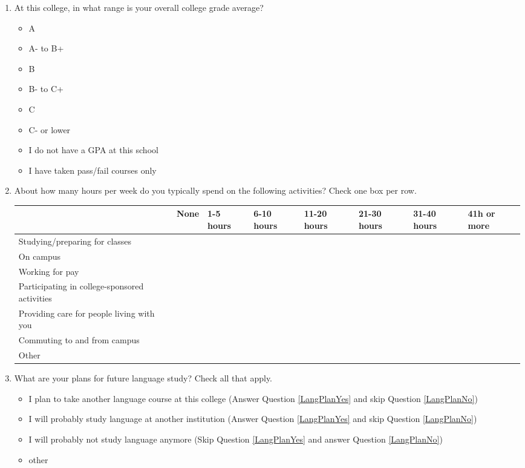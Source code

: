 \documentclass[letterpaper,10pt]{article}
\begin{document}
\begin{enumerate}[resume]
\item At this college, in what range is your overall college grade average?
\vspace{-0.1in}\begin{multicols}{2}
\begin{itemize}
	\item A
	\item A- to B+
	\item B
	\item B- to C+
	\item C
	\item C- or lower
	\item I do not have a GPA at this school 
	\item I have taken pass/fail courses only
\end{itemize}
\end{multicols}

\item About how many hours per week do you typically spend on the following activities? Check one box per row.	
\renewcommand{\arraystretch}{1.5}
\begin{tabular}{|l|p{0.37in}|p{0.37in}|p{0.37in}|p{0.37in}|p{0.37in}|p{0.37in}|p{0.39in}|}
\hline
&None&1-5 hours&6-10 hours&11-20 hours&21-30 hours&31-40 hours&41h or more\\
\hline
Studying/preparing for classes&&&&&&&\\
\hline
On campus&&&&&&&\\
\hline
Working for pay&&&&&&&\\
\hline
Participating in college-sponsored activities&&&&&&&\\
\hline
Providing care for people living with you&&&&&&&\\
\hline
Commuting to and from campus&&&&&&&\\
\hline
Other \underline{\hspace{2in}}&&&&&&&\\
\hline
\end{tabular}


\item What are your plans for future language study? Check all that apply.
\begin{itemize}
	\item I plan to take another language course at this college (Answer Question \ref{LangPlanYes} and skip Question \ref{LangPlanNo}) 
	\item I will probably study language at another institution (Answer Question \ref{LangPlanYes} and skip Question \ref{LangPlanNo})
	\item I will probably not study language anymore (Skip Question \ref{LangPlanYes} and answer Question \ref{LangPlanNo})
	\item other \underline{\hspace{2in}}
\end{itemize}


\end{enumerate}
\end{document}
